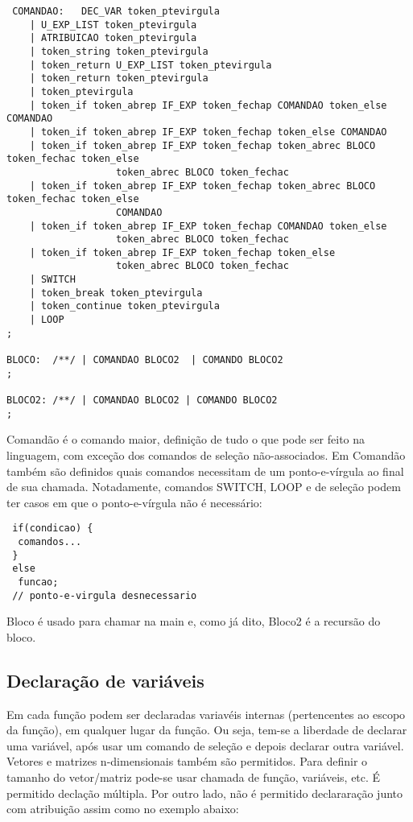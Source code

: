 \documentclass[a4paper,10pt]{article}
\begin{document}
\begin{verbatim}
 COMANDAO:   DEC_VAR token_ptevirgula
	| U_EXP_LIST token_ptevirgula
	| ATRIBUICAO token_ptevirgula
	| token_string token_ptevirgula
	| token_return U_EXP_LIST token_ptevirgula
	| token_return token_ptevirgula
	| token_ptevirgula
	| token_if token_abrep IF_EXP token_fechap COMANDAO token_else COMANDAO
	| token_if token_abrep IF_EXP token_fechap token_else COMANDAO
	| token_if token_abrep IF_EXP token_fechap token_abrec BLOCO token_fechac token_else 
                   token_abrec BLOCO token_fechac
	| token_if token_abrep IF_EXP token_fechap token_abrec BLOCO token_fechac token_else
                   COMANDAO
	| token_if token_abrep IF_EXP token_fechap COMANDAO token_else 
                   token_abrec BLOCO token_fechac
	| token_if token_abrep IF_EXP token_fechap token_else 
                   token_abrec BLOCO token_fechac
	| SWITCH
	| token_break token_ptevirgula
	| token_continue token_ptevirgula
	| LOOP	
;

BLOCO:	/**/ | COMANDAO BLOCO2 	| COMANDO BLOCO2
;

BLOCO2: /**/ | COMANDAO BLOCO2 | COMANDO BLOCO2
;
\end{verbatim}	

Comandão é o comando maior, definição de tudo o que pode ser feito na linguagem, com exceção dos comandos de seleção não-associados. 
Em Comandão também são definidos quais comandos necessitam de um ponto-e-vírgula ao final de sua chamada. Notadamente, comandos SWITCH,
LOOP e de seleção podem ter casos em que o ponto-e-vírgula não é necessário:

\begin{verbatim}
 if(condicao) {
  comandos...
 } 
 else 
  funcao;
 // ponto-e-virgula desnecessario 
\end{verbatim}


Bloco é usado para chamar na main e, como já dito, Bloco2 é a recursão do bloco.

\subsection{Declaração de variáveis}

Em cada função podem ser declaradas variavéis internas (pertencentes ao escopo da função), em qualquer lugar da função. Ou seja,
tem-se a liberdade de declarar uma variável, após usar um comando de seleção e depois declarar outra variável. Vetores e matrizes n-dimensionais
também são permitidos. Para definir o tamanho do vetor/matriz pode-se usar chamada de função, variáveis, etc. É permitido declação múltipla. Por outro lado,
não é permitido declararação junto com atribuição assim como no exemplo abaixo:
\end{document}
